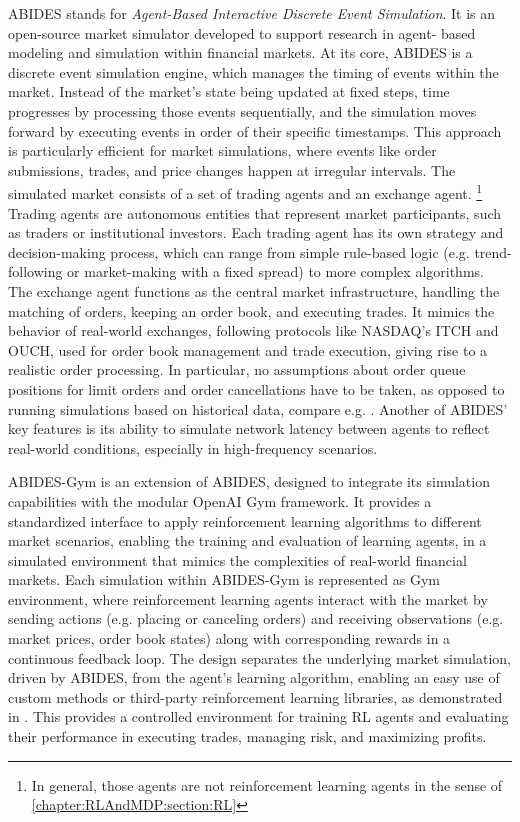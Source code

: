 \documentclass[
    a4paper,
    11pt,
    bibliography=totoc,
    listof=totoc,      
    headinclude=true,
    cleardoublepage=empty,
]{scrbook}
\theoremstyle{plain}
\theoremstyle{definition}
\theoremstyle{remark}
\begin{document}
ABIDES stands for \textit{Agent-Based Interactive Discrete Event Simulation}.
It is an open-source market simulator developed to support research in agent-%
based modeling and simulation within financial markets. At its core, ABIDES is
a discrete event simulation engine, which manages the timing of events within
the market. Instead of the market's state being updated at fixed steps, time
progresses by processing those events sequentially, and the simulation moves
forward by executing events in order of their specific timestamps. This
approach is particularly efficient for market simulations, where events like order
submissions, trades, and price changes happen at irregular intervals. The
simulated market consists of a set of trading agents and an exchange agent.%
\footnote{
    In general, those agents are not reinforcement learning agents in the 
    sense of \cref{chapter:RLAndMDP:section:RL}
}
Trading agents are autonomous entities that represent market participants, such
as traders or institutional investors. Each trading agent has its own strategy
and decision-making process, which can range from simple rule-based logic (e.g.
trend-following or market-making with a fixed spread) to more complex
algorithms. The exchange agent functions as the central market infrastructure,
handling the matching of orders, keeping an order book, and executing trades.
It mimics the behavior of real-world exchanges, following protocols like
NASDAQ's ITCH and OUCH, used for order book management and trade execution,
giving rise to a realistic order processing. In particular, no assumptions
about order queue positions for limit orders and order cancellations have to be
taken, as opposed to running simulations based on historical data, compare e.g.
\cite{spooner2018_mmrl}. Another of ABIDES’ key features is its ability to
simulate network latency between agents to reflect real-world conditions,
especially in high-frequency scenarios.

ABIDES-Gym is an extension of ABIDES, designed to integrate its simulation
capabilities with the modular OpenAI Gym framework. It provides a standardized
interface to apply reinforcement learning algorithms to different market
scenarios, enabling the training and evaluation of learning agents, in a
simulated environment that mimics the complexities of real-world financial
markets. Each simulation within ABIDES-Gym is represented as Gym environment,
where reinforcement learning agents interact with the market by sending actions
(e.g. placing or canceling orders) and receiving observations (e.g. market
prices, order book states) along with corresponding rewards in a continuous
feedback loop. The design separates the underlying market simulation, driven by
ABIDES, from the agent's learning algorithm, enabling an easy use of custom
methods or third-party reinforcement learning libraries, as demonstrated in
\cite{amrouni2022_aemdesafm}. This provides a controlled environment for
training RL agents and evaluating their performance in executing trades,
managing risk, and maximizing profits.
\end{document}
